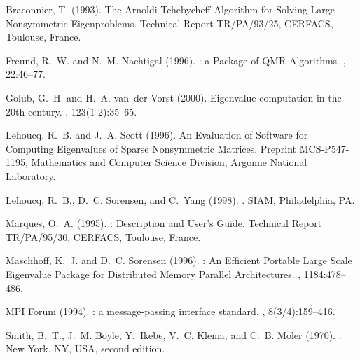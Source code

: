 \documentclass[titlepage,10pt,a4paper]{slepc}
\begin{document}
\begin{thebibliography}{19}
Braconnier, T. (1993).
\newblock The {A}rnoldi-{T}chebycheff Algorithm for Solving Large Nonsymmetric
  Eigenproblems.
\newblock Technical Report TR/PA/93/25, CERFACS, Toulouse, France.

Freund, R.~W. and N.~M. Nachtigal (1996).
: a Package of {QMR} Algorithms.
, 22:46--77.

Golub, G.~H. and H.~A. van~der Vorst (2000).
\newblock Eigenvalue computation in the 20th century.
,
  123(1-2):35--65.

Lehoucq, R.~B. and J.~A. Scott (1996).
\newblock An Evaluation of Software for Computing Eigenvalues of Sparse
  Nonsymmetric Matrices.
\newblock Preprint MCS-P547-1195, Mathematics and Computer Science Division,
  Argonne National Laboratory.

Lehoucq, R.~B., D.~C. Sorensen, and C.~Yang (1998).
.
\newblock SIAM, Philadelphia, PA.

Marques, O.~A. (1995).
: Description and User's Guide.
\newblock Technical Report TR/PA/95/30, CERFACS, Toulouse, France.

Maschhoff, K.~J. and D.~C. Sorensen (1996).
: An Efficient Portable Large Scale Eigenvalue Package for
  Distributed Memory Parallel Architectures.
, 1184:478--486.

{MPI Forum} (1994).
: a message-passing interface standard.
, 8(3/4):159--416.

Smith, B.~T., J.~M. Boyle, Y.~Ikebe, V.~C. Klema, and C.~B. Moler (1970).
.
\newblock New York, NY, USA, second edition.


\end{thebibliography}
\end{document}
